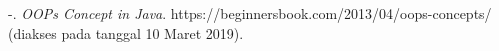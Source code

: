 \begin{thebibliography}{9}

-. \textit{OOPs Concept in Java}. https://beginnersbook.com/2013/04/oops-concepts/ (diakses pada tanggal 10 Maret 2019).

\end{thebibliography}